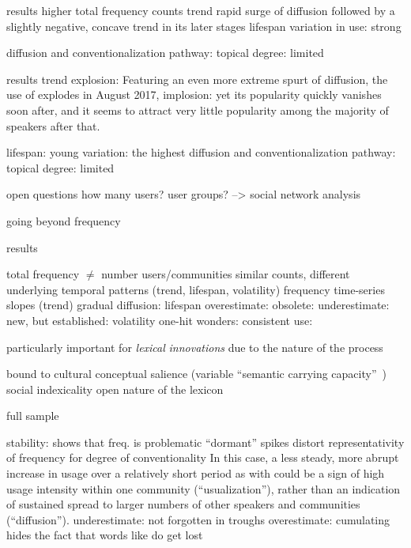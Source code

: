 \documentclass[
  a4paper,
  abstract=on,
  captions=tableabove
  ]{scrartcl}
\begin{document}
          results
            higher total frequency counts
            trend
              rapid surge of diffusion
              followed by a slightly negative, concave trend in its later stages
            lifespan
            variation in use: strong

          diffusion and conventionalization
            pathway: topical
            degree: limited


          results
            trend
              explosion: Featuring an even more extreme spurt of diffusion, the use of  explodes in August 2017,
              implosion: yet its popularity quickly vanishes soon after, and it seems to attract very little popularity among the majority of speakers after that.

            lifespan: young
            variation: the highest
          diffusion and conventionalization
            pathway: topical
            degree: limited


      open questions
        how many
        users?
        user groups?
    --> social network analysis




going beyond frequency

  results

    total frequency $\neq$ number users/communities
      similar counts, different underlying temporal patterns (trend, lifespan, volatility)
    frequency time-series
      slopes (trend)
        gradual diffusion: 
      lifespan
        overestimate: obsolete: 
        underestimate: new, but established: 
      volatility
        one-hit wonders: 
        consistent use: 

  particularly important for \emph{lexical} \emph{innovations} due to the nature of the process

    bound to cultural conceptual salience (variable \enquote{semantic carrying capacity}~\parencite{Nini2017ApplicationGrowth})
    social indexicality
    open nature of the lexicon


  full sample

  stability: shows that freq. is problematic
    \enquote{dormant}
    spikes distort representativity of frequency for degree of conventionality
      In this case, a less steady, more abrupt increase in usage over a relatively short period as with  could be a sign of high usage intensity within one community (\enquote{usualization}), rather than an indication of sustained spread to larger numbers of other speakers and communities (\enquote{diffusion}).
    underestimate:  not forgotten in troughs
    overestimate: cumulating hides the fact that words like  do get lost
\end{document}
